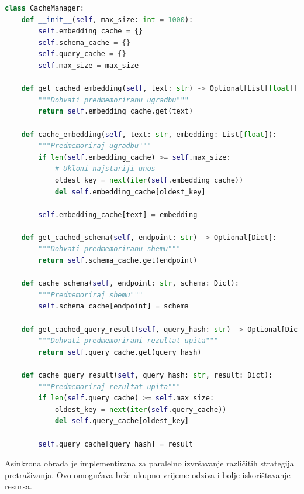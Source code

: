 \begin{lstlisting}[language=Python, caption=Implementacija predmemoriranja]
class CacheManager:
    def __init__(self, max_size: int = 1000):
        self.embedding_cache = {}
        self.schema_cache = {}
        self.query_cache = {}
        self.max_size = max_size
    
    def get_cached_embedding(self, text: str) -> Optional[List[float]]:
        """Dohvati predmemoriranu ugradbu"""
        return self.embedding_cache.get(text)
    
    def cache_embedding(self, text: str, embedding: List[float]):
        """Predmemoriraj ugradbu"""
        if len(self.embedding_cache) >= self.max_size:
            # Ukloni najstariji unos
            oldest_key = next(iter(self.embedding_cache))
            del self.embedding_cache[oldest_key]
        
        self.embedding_cache[text] = embedding
    
    def get_cached_schema(self, endpoint: str) -> Optional[Dict]:
        """Dohvati predmemoriranu shemu"""
        return self.schema_cache.get(endpoint)
    
    def cache_schema(self, endpoint: str, schema: Dict):
        """Predmemoriraj shemu"""
        self.schema_cache[endpoint] = schema
    
    def get_cached_query_result(self, query_hash: str) -> Optional[Dict]:
        """Dohvati predmemorirani rezultat upita"""
        return self.query_cache.get(query_hash)
    
    def cache_query_result(self, query_hash: str, result: Dict):
        """Predmemoriraj rezultat upita"""
        if len(self.query_cache) >= self.max_size:
            oldest_key = next(iter(self.query_cache))
            del self.query_cache[oldest_key]
        
        self.query_cache[query_hash] = result
\end{lstlisting}

Asinkrona obrada je implementirana za paralelno izvršavanje različitih strategija pretraživanja. Ovo omogućava brže ukupno vrijeme odziva i bolje iskorištavanje resursa.


